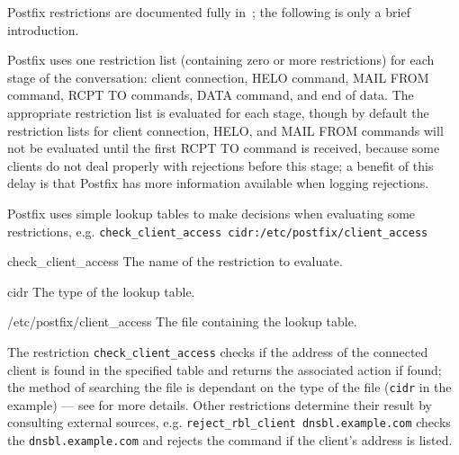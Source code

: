 \label{Mixing and matching Postfix restrictions}

Postfix restrictions are documented fully in~\cite{smtpd_access_readme,
smtpd_per_user_control, policy-servers}; the following is only a brief
introduction.

Postfix uses one restriction list (containing zero or more restrictions)
for each stage of the  conversation: client connection, HELO
command, MAIL FROM command, RCPT TO commands, DATA command, and end of
data.  The appropriate restriction list is evaluated for each stage, though
by default the restriction lists for client connection, HELO, and MAIL FROM
commands will not be evaluated until the first RCPT TO command is received,
because some clients do not deal properly with rejections before this
stage; a benefit of this delay is that Postfix has more information
available when logging rejections.

Postfix uses simple lookup tables to make decisions when evaluating some
restrictions, e.g.\newline{}
\tab{}\texttt{check\_client\_access~cidr:/etc/postfix/client\_access}

\begin{eqlist}

    \item [check\_client\_access] The name of the restriction to evaluate.

    \item [cidr] The type of the lookup table.

    \item [/etc/postfix/client\_access] The file containing the lookup
        table.

\end{eqlist}

The restriction \texttt{check\_client\_access} checks if the 
address of the connected client is found in the specified table and returns
the associated action if found; the method of searching the file is
dependant on the type of the file (\texttt{cidr} in the example) --- see
\cite{postfix-lookup-tables} for more details.  Other restrictions
determine their result by consulting external sources, e.g.\newline{}
\tab{}\texttt{reject\_rbl\_client dnsbl.example.com}\newline{} checks the
 \texttt{dnsbl.example.com} and rejects the command if the
client's  address is listed.

